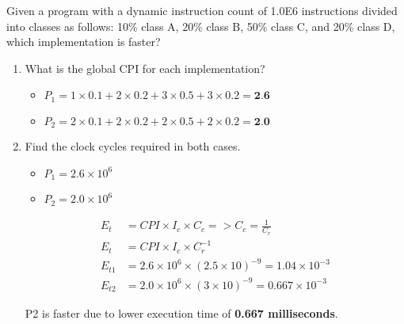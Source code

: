 \documentclass[10pt]{article}
\begin{document}
\begin{enumerate}
    Given a program with a dynamic instruction count of 1.0E6 instructions divided into classes as follows: 10\% class A, 20\% class B, 50\% class C, and 20\% class D, which implementation is faster?
    \begin{enumerate}
        \item What is the global CPI for each implementation?
        \begin{itemize}
            \item $P_1 = 1\times0.1+2\times0.2+3\times0.5+3\times0.2=\textbf{2.6}$
            \item $P_2 = 2\times0.1+2\times0.2+2\times0.5+2\times0.2=\textbf{2.0}$
        \end{itemize}
        \item Find the clock cycles required in both cases.
        \begin{itemize}
            \item $P_1 = 2.6\times10^6$
            \item $P_2 = 2.0\times10^6$
        \end{itemize}
        \begin{align*}
            E_{t} &= CPI \times I_c \times C_c => C_c = \frac{1}{C_r}\\
            E_{t} &= CPI \times I_c \times C_r^{-1}\\
            E_{t1} &= 2.6 \times 10^6\times (2.5\times10)^{-9} = 1.04 \times 10^{-3}\\
            E_{t2} &= 2.0 \times 10^6\times (3 \times 10)^{-9} = 0.667 \times 10^{-3}
        \end{align*}
        \begin{center}
            P2 is faster due to lower execution time of \textbf{0.667 milliseconds}.
        \end{center}
    \end{enumerate}
    

\end{enumerate}
\end{document}
